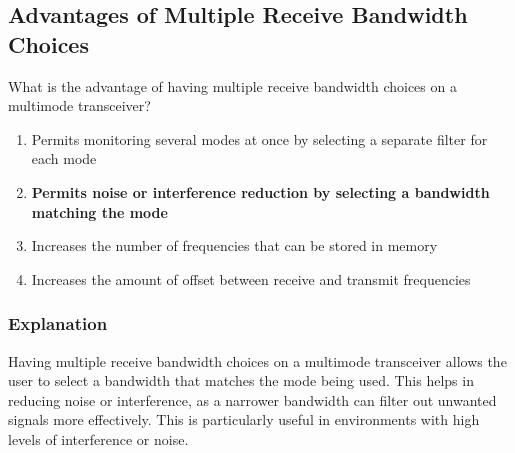\subsection{Advantages of Multiple Receive Bandwidth Choices}
\label{T4B08}

\begin{tcolorbox}[colback=gray!10!white,colframe=black!75!black,title=T4B08]
What is the advantage of having multiple receive bandwidth choices on a multimode transceiver?
\begin{enumerate}[noitemsep]
    \item Permits monitoring several modes at once by selecting a separate filter for each mode
    \item \textbf{Permits noise or interference reduction by selecting a bandwidth matching the mode}
    \item Increases the number of frequencies that can be stored in memory
    \item Increases the amount of offset between receive and transmit frequencies
\end{enumerate}
\end{tcolorbox}

\subsubsection*{Explanation}
Having multiple receive bandwidth choices on a multimode transceiver allows the user to select a bandwidth that matches the mode being used. This helps in reducing noise or interference, as a narrower bandwidth can filter out unwanted signals more effectively. This is particularly useful in environments with high levels of interference or noise.